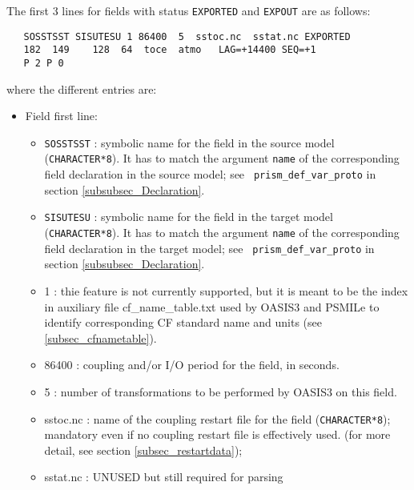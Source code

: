   The first 3 lines for fields with status {\tt EXPORTED} and 
  {\tt EXPOUT} are as follows:
  \begin{verbatim}
   SOSSTSST SISUTESU 1 86400  5  sstoc.nc  sstat.nc EXPORTED
   182  149    128  64  toce  atmo   LAG=+14400 SEQ=+1
   P 2 P 0 
  \end{verbatim}
  where the different entries are:
    \begin{itemize}
      \item Field first line:
        \begin{itemize}
        \item {\tt SOSSTSST} : symbolic name for the field in the
              source model ({\tt CHARACTER*8}). It has to match the
              argument {\tt name} of the corresponding field
              declaration in the source model; see {\tt
              prism\_def\_var\_proto} in section
              \ref{subsubsec_Declaration}.
        \item {\tt SISUTESU} : symbolic name for the field in the
              target model ({\tt CHARACTER*8}).  It has to match the
              argument {\tt name} of the corresponding field
              declaration in the target model; see {\tt
              prism\_def\_var\_proto} in section
              \ref{subsubsec_Declaration}.
        \item 1 : thie feature is not currently supported, but it is meant to be the
              index in auxiliary file cf\_name\_table.txt used by OASIS3 and PSMILe to 
              identify corresponding CF standard name and units (see \ref{subsec_cfnametable}).
        \item 86400 : coupling and/or I/O period for the field, in
        seconds. 
        \item 5 : number of transformations to be performed by OASIS3 on this field.  
        \item sstoc.nc : name of the coupling restart file for the
          field ({\tt CHARACTER*8}); 
          mandatory even if no coupling restart file is effectively
          used. (for more detail, see section \ref{subsec_restartdata});
        \item sstat.nc : UNUSED but still required for parsing

\end{itemize}
\end{itemize}
